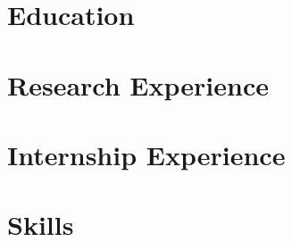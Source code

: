 \documentclass[12pt]{article}
\begin{document}
    \section{Education}
    

    \section{Research Experience}
    

    \section{Internship Experience}
    

    \section{Skills}
    
\end{document}

